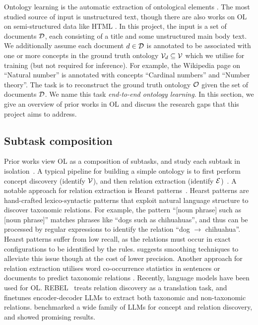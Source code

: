 Ontology learning is the automatic extraction of ontological elements \cite{hazman2011survey}. The most studied source of input is unstructured text, though there are also works on OL on semi-structured data like HTML \cite{karoui2004ontology}. In this project, the input is a set of documents $\mathcal{D}$, each consisting of a title and some unstructured main body text. We additionally assume each document $d \in \mathcal{D}$ is annotated to be associated with one or more concepts in the ground truth ontology $\mathcal{V}_{d} \subseteq \mathcal{V}$ which we utilise for training (but not required for inference). For example, the Wikipedia page on ``Natural number'' is annotated with concepts ``Cardinal numbers'' and ``Number theory''. The task is to reconstruct the ground truth ontology $\mathcal{O}$ given the set of documents $\mathcal{D}$. We name this task \emph{end-to-end ontology learning}. In this section, we give an overview of prior works in OL and discuss the research gaps that this project aims to address.

\subsection{Subtask composition}

Prior works view OL as a composition of subtasks, and study each subtask in isolation~\cite{buitelaar2005ontology,asim2018survey}. A typical pipeline for building a simple ontology is to first perform concept discovery (identify $\mathcal{V}$), and then relation extraction (identify $\mathcal{E}$)~\cite{cimiano2005text2onto,kaushik2018automatic}. A notable approach for relation extraction is Hearst patterns~\cite{hearst1998automated}. Hearst patterns are hand-crafted lexico-syntactic patterns that exploit natural language structure to discover taxonomic relations. For example, the pattern ``[noun phrase] such as [noun phrase]'' matches phrases like ``dogs such as chihuahuas'', and thus can be processed by regular expressions to identify the relation ``dog $\to$ chihuahua''. Hearst patterns suffer from low recall, as the relations must occur in exact configurations to be identified by the rules. \citet{roller2018hearst} suggests smoothing techniques to alleviate this issue though at the cost of lower precision. Another approach for relation extraction utilises word co-occurrence statistics in sentences or documents to predict taxonomic relations \cite{cimiano2005learning}. Recently, language models have been used for OL. REBEL~\cite{cabot2021rebel} treats relation discovery as a translation task, and finetunes encoder-decoder LLMs to extract both taxonomic and non-taxonomic relations. \citet{babaei2023llms4ol} benchmarked a wide family of LLMs for concept and relation discovery, and showed promising results.

